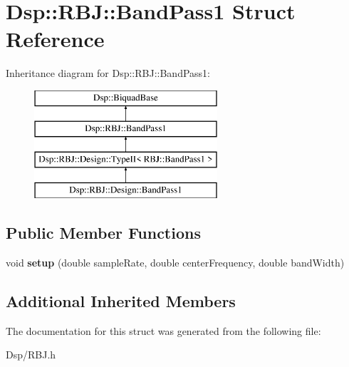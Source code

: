 \hypertarget{structDsp_1_1RBJ_1_1BandPass1}{\section{Dsp\-:\-:R\-B\-J\-:\-:Band\-Pass1 Struct Reference}
\label{structDsp_1_1RBJ_1_1BandPass1}
}
Inheritance diagram for Dsp\-:\-:R\-B\-J\-:\-:Band\-Pass1\-:\begin{figure}[H]
\begin{center}
\leavevmode
\includegraphics[height=4.000000cm]{structDsp_1_1RBJ_1_1BandPass1}
\end{center}
\end{figure}
\subsection*{Public Member Functions}
\begin{DoxyCompactItemize}
\item 
\hypertarget{structDsp_1_1RBJ_1_1BandPass1_a15d16dd9383e162c229b8598dbd5d09f}{void {\bfseries setup} (double sample\-Rate, double center\-Frequency, double band\-Width)}\label{structDsp_1_1RBJ_1_1BandPass1_a15d16dd9383e162c229b8598dbd5d09f}

\end{DoxyCompactItemize}
\subsection*{Additional Inherited Members}


The documentation for this struct was generated from the following file\-:\begin{DoxyCompactItemize}
\item 
Dsp/R\-B\-J.\-h\end{DoxyCompactItemize}
